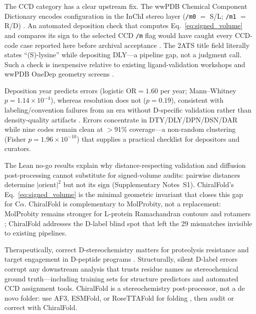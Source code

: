 \documentclass[numsec,webpdf,modern,large,namedate]{oup-authoring-template}
\begin{document}
The CCD category has a clear upstream fix. The wwPDB Chemical Component Dictionary encodes configuration in the InChI stereo layer (\texttt{/m0} $=$ S/L; \texttt{/m1} $=$ R/D) \citep{shao2015,westbrook2015}. An automated deposition check that computes Eq.~\ref{eq:signed_volume} and compares its sign to the selected CCD \texttt{/m} flag would have caught every CCD-code case reported here before archival acceptance \citep{outcome2016,gore2017}. The 2ATS title field literally states ``(S)-lysine'' while depositing DLY---a pipeline gap, not a judgment call. Such a check is inexpensive relative to existing ligand-validation workshops and wwPDB OneDep geometry screens \citep{outcome2016,read2011}.

Deposition year predicts errors (logistic OR$=1.60$ per year; Mann--Whitney $p=1.14\times10^{-4}$), whereas resolution does not ($p=0.19$), consistent with labeling/convention failures from an era without D-specific validation rather than density-quality artifacts \citep{henrick2008}. Errors concentrate in DTY/DLY/DPN/DSN/DAR while nine codes remain clean at $>$91\% coverage---a non-random clustering (Fisher $p=1.96\times10^{-10}$) that supplies a practical checklist for depositors and curators.

The Lean no-go results explain why distance-respecting validation and diffusion post-processing cannot substitute for signed-volume audits: pairwise distances determine $|\mathrm{orient}|^2$ but not its sign (Supplementary Notes~S1). ChiralFold's Eq.~\ref{eq:signed_volume} is the minimal geometric invariant that closes this gap for C$\alpha$. ChiralFold is complementary to MolProbity, not a replacement: MolProbity remains stronger for L-protein Ramachandran contours and rotamers \citep{williams2018}; ChiralFold addresses the D-label blind spot that left the 29 mismatches invisible to existing pipelines.

Therapeutically, correct D-stereochemistry matters for proteolysis resistance and target engagement in D-peptide programs \citep{welch2009,funke2010,garton2018}. Structurally, silent D-label errors corrupt any downstream analysis that trusts residue names as stereochemical ground truth---including training sets for structure predictors and automated CCD assignment tools. ChiralFold is a stereochemistry post-processor, not a de novo folder: use AF3, ESMFold, or RoseTTAFold for folding \citep{abramson2024,lin2023,baek2021}, then audit or correct with ChiralFold.
\end{document}

